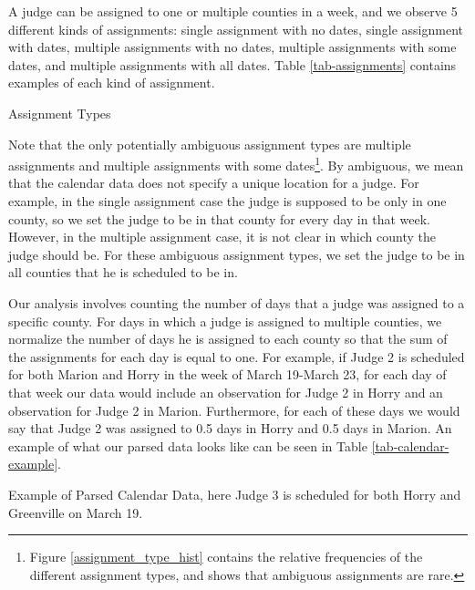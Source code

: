 \documentclass[11pt, oneside]{article}   	%
\theoremstyle{ModifiedStyle}
\begin{document}
      A judge can be assigned to one or multiple counties in a week, and we observe 5 different kinds of assignments: single assignment with no dates, single assignment with dates, multiple assignments with no dates, multiple assignments with some dates, and multiple assignments with all dates. Table \ref{tab-assignments} contains examples of each kind of assignment.

			\begin{table}[H]
        \centering
        \caption{Assignment Types}
        \label{tab-assignments}
        
      \end{table}

			Note that the only potentially ambiguous assignment types are multiple assignments and multiple assignments with some dates\footnote{Figure \ref{assignment_type_hist} contains the relative frequencies of the different assignment types, and shows that ambiguous assignments are rare.}. By ambiguous, we mean that the calendar data does not specify a unique location for a judge. For example, in the single assignment case the judge is supposed to be only in one county, so we set the judge to be in that county for every day in that week. However, in the multiple assignment case, it is not clear in which county the judge should be. For these ambiguous assignment types, we set the judge to be in all counties that he is scheduled to be in.

			Our analysis involves counting the number of days that a judge was assigned to a specific county. For days in which a judge is assigned to multiple counties, we normalize the number of days he is assigned to each county so that the sum of the assignments for each day is equal to one. For example, if Judge 2 is scheduled for both Marion and Horry in the week of March 19-March 23, for each day of that week our data would include an observation for Judge 2 in Horry and an observation for Judge 2 in Marion. Furthermore, for each of these days we would say that Judge 2 was assigned to 0.5 days in Horry and 0.5 days in Marion. An example of what our parsed data looks like can be seen in Table \ref{tab-calendar-example}.

			\begin{table}[H]
        \centering
        \caption{Example of Parsed Calendar Data, here Judge 3 is scheduled for both Horry and Greenville on March 19.}
        \label{tab-calendar-example}
        
      \end{table}
\end{document}
